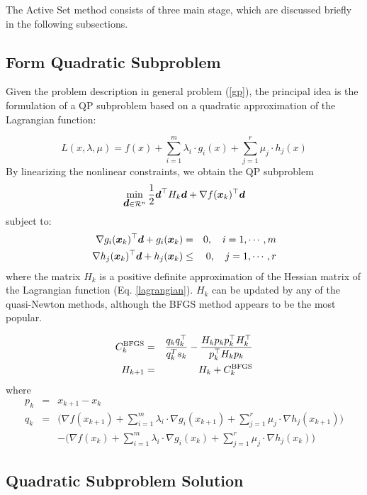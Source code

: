 \documentclass[journal,comsoc]{IEEEtran}
\begin{document}
 The Active Set method consists of three main stage, which are discussed briefly in the following subsections.
 
 \subsection{Form Quadratic Subproblem}
 
 Given the problem description in general problem (\ref{gp}), the principal idea is the formulation of a QP subproblem based on a quadratic approximation of the Lagrangian function:
 
 \begin{equation}
     L(x, \lambda, \mu) = f(x) + \sum_{i=1}^m \lambda_i \cdot g_i(x) + \sum_{j=1}^r \mu_j \cdot  h_j(x) \label{lagrangian}
 \end{equation}
 By linearizing the nonlinear constraints, we obtain the QP subproblem
 \begin{equation}
  \min_{\mbox{\boldmath $d$} \in \mathcal{R}^n} {1 \over 2} \mbox{\boldmath $d$}^\top H_k \mbox{\boldmath $d$} + \nabla f(\mbox{\boldmath $x$}_k)^\top \mbox{\boldmath $d$}
\end{equation}
subject to:
\begin{eqnarray*}
  \nabla g_i(\mbox{\boldmath $x$}_k)^\top \mbox{\boldmath $d$} + g_i(\mbox{\boldmath $x$}_k) & = & 0 , \quad i = 1,\cdots , m \\
  \nabla h_j(\mbox{\boldmath $x$}_k)^\top \mbox{\boldmath $d$} + h_j(\mbox{\boldmath $x$}_k) & \leq & 0  , \quad j = 1,\cdots , r
\end{eqnarray*}
where the matrix $H_k$ is a positive definite approximation of the Hessian matrix of the Lagrangian function (Eq. \ref{lagrangian}). $H_k$ can be updated by any of the quasi-Newton methods, although the BFGS method appears to be the most popular.

\begin{eqnarray}
    C_k^{\rm BFGS} & = & {q_kq_k^\top \over q_k^T s_k} - {H_k p_k p_k^\top H_k^\top \over p_k^\top H_k p_k} \\
    H_{k+1} & = & H_{k} + C_k^{\rm BFGS}
\end{eqnarray}
where
\begin{eqnarray*}
    p_k & = & x_{k+1} - x_k \\
    q_k & = & \Biggl(\nabla f(x_{k+1}) + \sum_{i=1}^m \lambda_i \cdot \nabla g_i(x_{k+1}) + \sum_{j=1}^r \mu_j \cdot \nabla h_j(x_{k+1})\Biggr) \\
    & & - \Biggl(\nabla f(x_{k}) + \sum_{i=1}^m \lambda_i \cdot \nabla g_i(x_{k}) + \sum_{j=1}^r \mu_j \cdot \nabla h_j(x_{k})\Biggr)
\end{eqnarray*}


\subsection{Quadratic Subproblem Solution}
\end{document}
